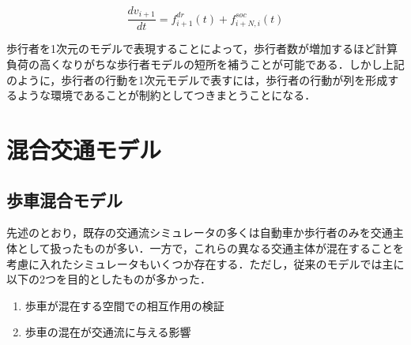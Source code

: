 \begin{equation}
 \frac{dv_{i+1}}{dt} = f_{i+1}^{dr}(t) + f_{i+N,i}^{soc}(t)
\end{equation}

歩行者を1次元のモデルで表現することによって，歩行者数が増加するほど計算負荷の高くなりがちな歩行者モデルの短所を補うことが可能である．しかし上記のように，歩行者の行動を1次元モデルで表すには，歩行者の行動が列を形成するような環境であることが制約としてつきまとうことになる．

\section{混合交通モデル}

\subsection{歩車混合モデル}

先述のとおり，既存の交通流シミュレータの多くは自動車か歩行者のみを交通主体として扱ったものが多い．一方で，これらの異なる交通主体が混在することを考慮に入れたシミュレータもいくつか存在する．ただし，従来のモデルでは主に以下の2つを目的としたものが多かった．

\begin{enumerate}
   \item 歩車が混在する空間での相互作用の検証
   \item 歩車の混在が交通流に与える影響
\end{enumerate}

